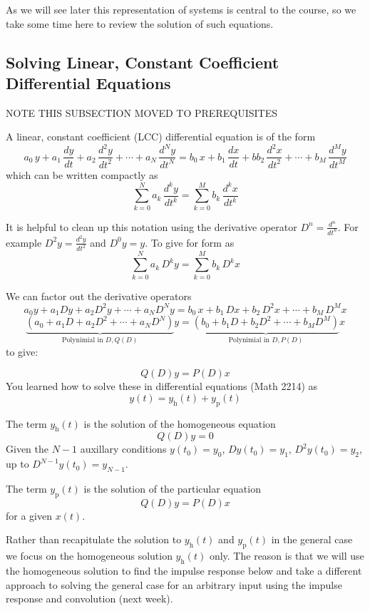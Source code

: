As we will see later this representation of systems is central to the course, so we take some time here to review the solution of such equations.
 
\subsection{Solving Linear, Constant Coefficient Differential Equations}

NOTE THIS SUBSECTION MOVED TO PREREQUISITES

A linear, constant coefficient (LCC) differential equation is of the form
\[
a_0\, y + a_1\, \frac{dy}{dt} + a_2\, \frac{d^2y}{dt^2} + \cdots + a_N\, \frac{d^Ny}{dt^N}  = b_0\, x + b_1\, \frac{dx}{dt} + bb_2\, \frac{d^2x}{dt^2} + \cdots + b_M\, \frac{d^My}{dt^M}
\]
which can be written compactly as
\[
\sum\limits_{k = 0}^{N} a_k\, \frac{d^ky}{dt^k} = \sum\limits_{k = 0}^{M} b_k\, \frac{d^kx}{dt^k}
\]

It is helpful to clean up this notation using the derivative operator $D^n = \frac{d^n}{dt^n}$. For example
$D^2y = \frac{d^2y}{dt^2}$ and $D^0 y= y$. To give for form as
\[
\sum\limits_{k = 0}^{N} a_k\, D^k y = \sum\limits_{k = 0}^{M} b_k\, D^k x
\]

We can factor out the derivative operators
\[
a_0y + a_1Dy + a_2D^2y + \cdots + a_ND^Ny  = b_0\, x + b_1\, Dx + b_2\, D^2x + \cdots + b_M\, D^M x
\]
\[
\underbrace{\left(a_0 + a_1D + a_2D^2 + \cdots + a_ND^N\right)}_{\text{Polynimial in } D, Q(D)} y = \underbrace{\left(b_0 + b_1 D + b_2 D^2 + \cdots + b_M D^M\right)}_{\text{Polynimial in } D, P(D)} x
\]
to give:
  
\[
Q(D)y = P(D)x
\]
You learned how to solve these in differential equations (Math 2214) as
\[
y(t) = y_\text{h}(t) + y_\text{p}(t)
\]

The term $y_\text{h}(t)$ is the solution of the homogeneous equation
\[
Q(D)y = 0
\]
Given the $N-1$ auxillary conditions $y(t_0) = y_0$, $Dy(t_0) = y_1$, $D^2y(t_0) = y_2$, up to $D^{N-1}y(t_0) = y_{N-1}$.

The term $y_\text{p}(t)$ is the solution of the particular equation
\[
Q(D)y = P(D)x
\]
for a given $x(t)$.

Rather than recapitulate the solution to $y_\text{h}(t)$ and $y_\text{p}(t)$ in the general case we focus on the homogeneous solution $y_\text{h}(t)$ only. The reason is that we will use the homogeneous solution to find the impulse response below and take a different approach to solving the general case for an arbitrary input using the impulse response and convolution (next week).

